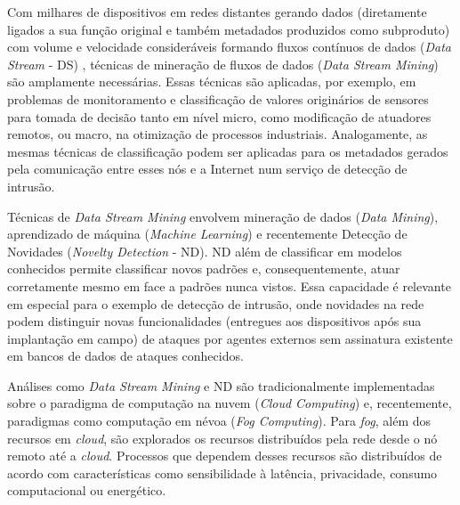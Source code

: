 
Com milhares de dispositivos em redes distantes gerando dados (diretamente
ligados a sua função original e também metadados produzidos como subproduto) com
volume e velocidade consideráveis formando fluxos contínuos de dados (\emph{Data
Stream} - DS) , técnicas de mineração de fluxos de dados
(\emph{Data Stream Mining}) são amplamente necessárias.
Essas técnicas são
aplicadas, por exemplo, em problemas de monitoramento e classificação de valores
originários de sensores para tomada de decisão tanto em nível micro, como
modificação de atuadores remotos, ou macro, na otimização de processos
industriais.
Analogamente, as mesmas técnicas de classificação podem ser aplicadas para os
metadados gerados pela comunicação entre esses nós e a Internet num serviço de
detecção de intrusão.


Técnicas de \emph{Data Stream Mining} envolvem mineração de dados
(\emph{Data Mining}), aprendizado de
máquina (\emph{Machine Learning}) e recentemente Detecção de Novidades
(\emph{Novelty Detection} - ND).
ND além de classificar em modelos conhecidos
permite classificar novos padrões e, consequentemente, atuar corretamente mesmo
em face a padrões nunca vistos.
Essa capacidade é relevante em especial para o
exemplo de detecção de intrusão, onde novidades na rede podem distinguir novas
funcionalidades (entregues aos dispositivos após sua implantação em campo) de
ataques por agentes externos sem assinatura existente em bancos de
dados de ataques conhecidos.


Análises como \emph{Data Stream Mining} e ND são tradicionalmente implementadas
sobre o paradigma de computação na nuvem
(\emph{Cloud Computing}) e, recentemente, paradigmas como computação em névoa
(\emph{Fog Computing}). Para \emph{fog}, além dos recursos em \emph{cloud}, são
explorados os recursos distribuídos pela rede desde o nó remoto até a
\emph{cloud}. Processos que dependem desses recursos são distribuídos de acordo
com características como sensibilidade à latência, privacidade,
consumo computacional ou energético.

